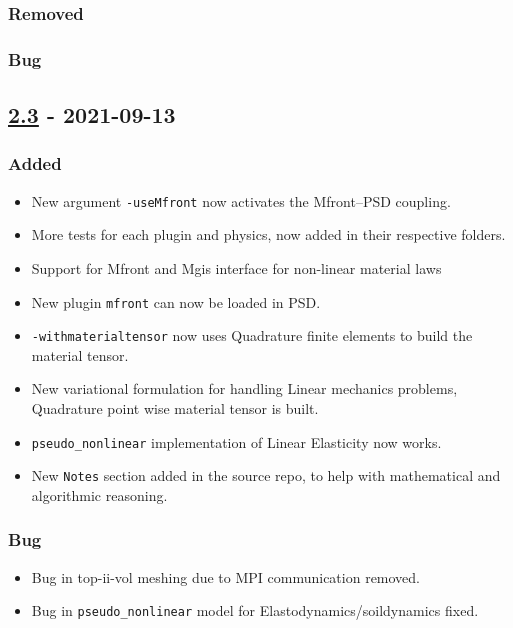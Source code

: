 \subsubsection{Removed}

\subsubsection{Bug}

\subsection{\texorpdfstring{\href{https://gitlab.com/PsdSolver/psd_sources/-/tree/v2.3}{2.3}
- 2021-09-13}{2.3 - 2021-09-13}}

\subsubsection{Added}

\begin{itemize}
\tightlist
\item
  New argument \lstinline!-useMfront! now activates the Mfront--PSD
  coupling.
\item
  More tests for each plugin and physics, now added in their respective
  folders.
\item
  Support for Mfront and Mgis interface for non-linear material laws
\item
  New plugin \lstinline!mfront! can now be loaded in PSD.
\item
  \lstinline!-withmaterialtensor! now uses Quadrature finite elements to
  build the material tensor.
\item
  New variational formulation for handling Linear mechanics problems,
  Quadrature point wise material tensor is built.
\item
  \lstinline!pseudo_nonlinear! implementation of Linear Elasticity now
  works.
\item
  New \lstinline!Notes! section added in the source repo, to help with
  mathematical and algorithmic reasoning.
\end{itemize}

\subsubsection{Bug}

\begin{itemize}
\tightlist
\item
  Bug in top-ii-vol meshing due to MPI communication removed.
\item
  Bug in \lstinline!pseudo_nonlinear! model for
  Elastodynamics/soildynamics fixed.
\end{itemize}

